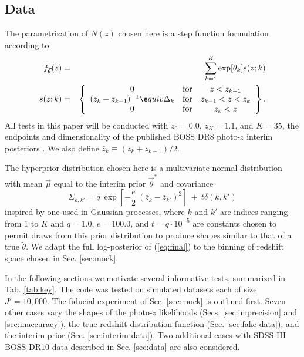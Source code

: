 \documentclass[preprint]{aastex}
\begin{document}
\subsection{Data}
\label{sec:alldata}

The parametrization of $N(z)$ chosen here is a step function formulation 
according to
\begin{eqnarray}
\label{eq:steps}
f_{\vec{\theta}}(z)&=&\sum_{k=1}^{K}\exp[\theta_{k}]s(z;k)\\
s(z;k)&=&\left\{\begin{array}{ccc}0&\text{for}&z<z_{k-1}\\(z_{k}-z_{k-1})^{-1}\e
quiv\Delta_{k}&\text{for}&z_{k-1}<z<z_{k}\\0&\text{for}&z_{k}<z\end{array}\right
\}.
\end{eqnarray}
All tests in this paper will be conducted with $z_{0}=0.0$, $z_{K}=1.1$, and 
$K=35$, the endpoints and dimensionality of the published BOSS DR8 photo-$z$ 
interim posteriors \citet{Sheldon2012}.  We also define 
$\bar{z}_{k}\equiv(z_{k}+z_{k-1})/2$.

The hyperprior distribution chosen here is a multivariate normal distribution 
with mean $\vec{\mu}$ equal to the interim prior $\vec{\theta}^{*}$ and 
covariance
\begin{equation}
\label{eq:priorcov}
\Sigma_{k,k'} = q\ \exp[-\frac{e}{2}\ (\bar{z}_{k}-\bar{z}_{k'})^{2}]\ +\ 
t\delta(k,k')
\end{equation}
inspired by one used in Gaussian processes, where $k$ and $k'$ are indices 
ranging from $1$ to $K$ and $q=1.0$, $e=100.0$, and $t=q\cdot10^{-5}$ are 
constants chosen to permit draws from this prior distribution to produce shapes 
similar to that of a true $\tilde{\theta}$.  We adapt the full log-posterior of 
(\ref{eq:final}) to the binning of redshift space chosen in Sec. \ref{sec:mock}.

In the following sections we motivate several informative tests, summarized in 
Tab. \ref{tab:key}.  The code was tested on simulated datasets each of size 
$J'=10,000$.  The fiducial experiment of Sec. \ref{sec:mock} is outlined first. 
 Seven other cases vary the shapes of the photo-$z$ likelihoods (Secs. 
\ref{sec:imprecision} and \ref{sec:inaccuracy}), the true redshift distribution 
function (Sec. \ref{sec:fake-data}), and the interim prior (Sec. 
\ref{sec:interim-data}).  Two additional cases with SDSS-III BOSS DR10 data 
described in Sec. \ref{sec:data} are also considered.
\end{document}
